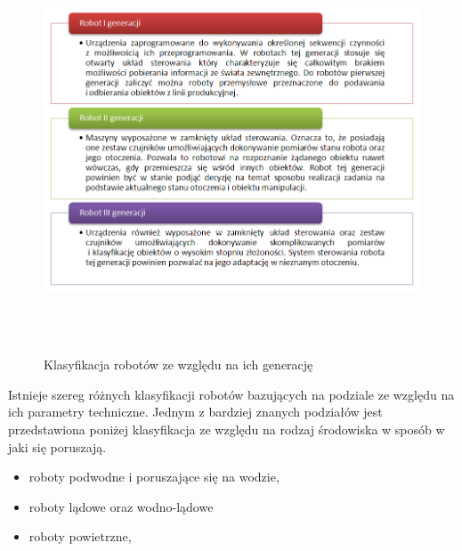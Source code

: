 \begin{figure}[h!]
 \centering \includegraphics[height=120mm]{../images/ch01/robot_generations.png}
 \caption{Klasyfikacja robotów ze względu na ich generację}
 \label{fig:RobotsGenerations}
\end{figure}

Istnieje szereg różnych klasyfikacji robotów bazujących na podziale ze względu na
ich parametry techniczne. Jednym z bardziej znanych podziałów jest przedstawiona
poniżej klasyfikacja ze względu na rodzaj środowiska w sposób w jaki się
poruszają.
\begin{itemize}
  \item roboty podwodne i poruszające się na wodzie,
  \item roboty lądowe oraz wodno-lądowe
  \item roboty powietrzne,
\end{itemize}

